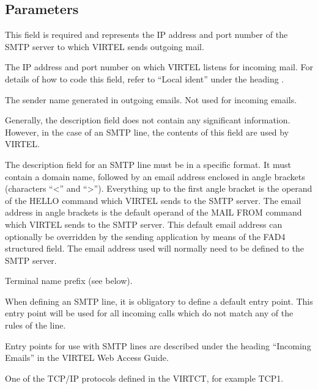 \documentclass[letterpaper,10pt,english]{sphinxmanual}
\begin{document}
\subsection{Parameters}
\label{\detokenize{connectivity_guide:index-18}}\label{\detokenize{connectivity_guide:id3}}\begin{description}
\sphinxAtStartPar
This field is required and represents the IP address and port number of the SMTP server to which VIRTEL sends outgoing mail.

\sphinxAtStartPar
The IP address and port number on which VIRTEL listens for incoming mail. For details of how to code this field, refer to “Local ident” under the heading .

\sphinxAtStartPar
The sender name generated in outgoing e\sphinxhyphen{}mails. Not used for incoming e\sphinxhyphen{}mails.

\sphinxAtStartPar
Generally, the description field does not contain any significant information. However, in the case of an SMTP line, the contents of this field are used by VIRTEL.

\sphinxAtStartPar
The description field for an SMTP line must be in a specific format. It must contain a domain name, followed by an e\sphinxhyphen{}mail address enclosed in angle brackets (characters “\textless{}” and “\textgreater{}”). Everything up to the first angle bracket is the operand of the HELLO command which VIRTEL sends to the SMTP server. The e\sphinxhyphen{}mail address in angle brackets is the default operand of the MAIL FROM command which VIRTEL sends to the SMTP server. This default e\sphinxhyphen{}mail address can optionally be overridden by the sending application by means of the
FAD4 structured field. The e\sphinxhyphen{}mail address used will normally need to be defined to the SMTP server.

\sphinxAtStartPar
Terminal name prefix (see below).

\sphinxAtStartPar
When defining an SMTP line, it is obligatory to define a default entry point. This entry point will be used for all incoming calls which do not match any of the rules of the line.

\sphinxAtStartPar
Entry points for use with SMTP lines are described under the heading “Incoming E\sphinxhyphen{}mails” in the VIRTEL Web Access Guide.

\sphinxAtStartPar
One of the TCP/IP protocols defined in the VIRTCT, for example TCP1.


\end{description}
\end{document}

